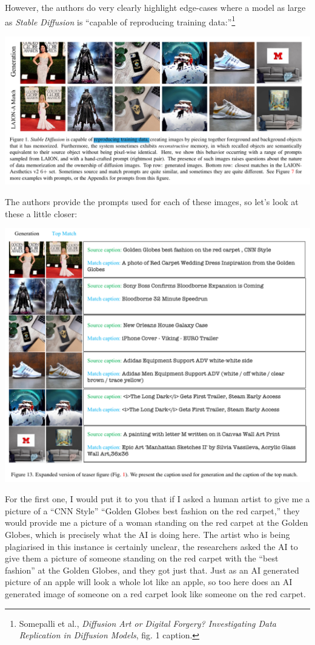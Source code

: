 \documentclass[11pt]{article}
\begin{document}
However, the authors do very clearly highlight edge-cases where a model as large as \emph{Stable Diffusion} is ``capable of reproducing training data:''\footnote{Somepalli et al., \emph{Diffusion Art or Digital Forgery? Investigating Data Replication in Diffusion Models}, fig. 1 caption.}
\begin{center}
\includegraphics[width=.9\linewidth]{./images/replication-stable-diffusion.png}
\end{center}

The authors provide the prompts used for each of these images, so let's look at these a little closer:
\begin{center}
\includegraphics[width=.9\linewidth]{./images/replication-stable-diffusion-prompts.png}
\end{center}

For the first one, I would put it to you that if I asked a human artist to give me a picture of a ``CNN Style'' ``Golden Globes best fashion on the red carpet,'' they would provide me a picture of a woman standing on the red carpet at the Golden Globes, which is precisely what the AI is doing here. The artist who is being plagiarised in this instance is certainly unclear, the researchers asked the AI to give them a picture of someone standing on the red carpet with the ``best fashion'' at the Golden Globes, and they got just that. Just as an AI generated picture of an apple will look a whole lot like an apple, so too here does an AI generated image of someone on a red carpet look like someone on the red carpet.
\end{document}

